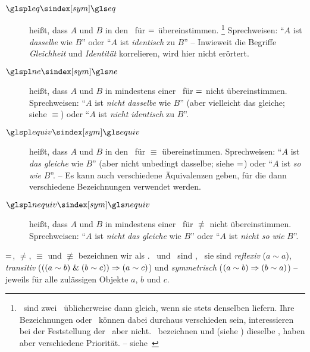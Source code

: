 \begin{description}
	\item[$\glsSym{eq}$]  \label{def:Gleichheit}
	 heißt, dass $A$ und $B$ in den \interessierendenEigenschaften\ für $=$ übereinstimmen.%
	\footnote{%
		\textZB\ sind zwei \Junktoren\ üblicherweise dann gleich, wenn sie stets denselben \emph{\Wahrheitswert} liefern.
		Ihre Bezeichnungen oder \Symbole\ können dabei durchaus verschieden sein, interessieren bei der Feststellung der \Gleichheit\ aber nicht.
		\textZB\ bezeichnen \chrqt{$\metaandsym$} und \chrqt{$\srand$} (siehe ) dieselbe \Operation, haben aber verschiedene Priorität. -- siehe~
	}
	Sprechweisen: \enquote{$A$ ist \emph{dasselbe} wie $B$} oder \enquote{$A$ ist \emph{identisch} zu $B$}
	-- Inwieweit die Begriffe \emph{Gleichheit} und \emph{Identität} korrelieren, wird hier nicht erörtert.
	\item[$\glsSym{ne}$]  \label{def:Ungleichheit}
	 heißt, dass $A$ und $B$ in mindestens einer \interessierendenEigenschaft\ für $=$ nicht übereinstimmen.
	Sprechweisen: \enquote{$A$ ist \emph{nicht dasselbe} wie $B$} (aber vielleicht das gleiche; siehe $\equiv$) oder \enquote{$A$ ist \emph{nicht identisch} zu $B$}.
	\item[$\glsSym{equiv}$]  \label{def:Aequivalenz}
	 heißt, dass $A$ und $B$ in den \interessierendenEigenschaften\ für $\equiv$ übereinstimmen.
	Sprechweisen: \enquote{$A$ ist \emph{das gleiche} wie $B$} (aber nicht unbedingt dasselbe; siehe $=$) oder \enquote{$A$ ist \emph{so wie} $B$}.
	-- Es kann auch verschiedene Äquivalenzen geben, für die dann verschiedene Bezeichnungen verwendet werden.
	\item[$\glsSym{nequiv}$]  \label{def:Kontravalenz}
	 heißt, dass $A$ und $B$ in mindestens einer \interessierendenEigenschaft\ für $\nequiv$ nicht übereinstimmen.
	Sprechweisen: \enquote{$A$ ist \emph{nicht das gleiche} wie $B$} oder \enquote{$A$ ist \emph{nicht so wie} $B$}.
\end{description}

$=$, $\ne$, $\equiv$ und $\nequiv$ bezeichnen wir als  .
\Gleichheit\ und \Aequivalenz\ sind , \textdh\ sie sind \emph{reflexiv} ($a \sim a$), \emph{transitiv} ($((a \sim b) \;\&\; (b \sim c)) \Rightarrow (a \sim c)$) und \emph{symmetrisch} ($(a \sim b) \Rightarrow (b \sim a)$)
-- jeweils für alle zulässigen Objekte $a$, $b$ und $c$.

